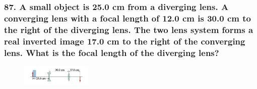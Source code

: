 \documentclass{article}
\begin{document}
\subsubsection*{
    87. A small object is 25.0 cm from a diverging lens. A converging lens with a focal length of 12.0 cm is
    30.0 cm to the right of the diverging lens. The two lens system forms a real inverted image 17.0 cm to the
    right of the converging lens. What is the focal length of the diverging lens?
}
\begin{figure}[h]
    \begin{center}
        \includegraphics[width=0.3\textwidth]{figures/p87.png}
    \end{center}
\end{figure}
\end{document}
